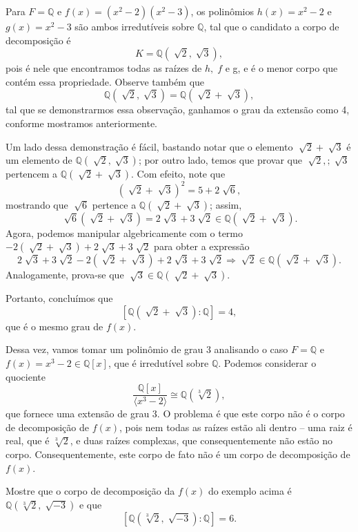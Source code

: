 \documentclass[../algebraIII_notes.tex]{subfiles}
\begin{document}
\begin{example}
	Para \(F=\mathbb{Q}\) e \(f(x)=(x^{2}-2)(x^{2}-3)\), os polinômios \(h(x)=x^{2}-2\) e \(g(x)=x^{2}-3\) são ambos irredutíveis sobre \(\mathbb{Q}\), tal que o candidato a corpo de decomposição é
	\[
		K=\mathbb{Q}(\sqrt[]{2}, \sqrt[]{3}),
	\]
	pois é nele que encontramos todas as raízes de \(h, \; f\) e g, e é o menor corpo que contém essa propriedade. Observe também que
	\[
		\mathbb{Q}(\sqrt[]{2}, \sqrt[]{3})=\mathbb{Q}(\sqrt[]{2}+\sqrt[]{3}),
	\]
	tal que se demonstrarmos essa observação, ganhamos o grau da extensão como 4, conforme mostramos anteriormente.

	Um lado dessa demonstração é fácil, bastando notar que o elemento \(\sqrt[]{2}+\sqrt[]{3}\) é um elemento de \(\mathbb{Q}(\sqrt[]{2}, \sqrt[]{3})\); por outro lado, temos que provar que \(\sqrt[]{2},; \sqrt[]{3}\) pertencem a \(\mathbb{Q}(\sqrt[]{2}+\sqrt[]{3})\). Com efeito, note que
	\[
		(\sqrt[]{2}+\sqrt[]{3})^{2}=5+2\sqrt[]{6},
	\]
	mostrando que \(\sqrt[]{6}\) pertence a \(\mathbb{Q}(\sqrt[]{2}+\sqrt[]{3})\); assim,
	\[
		\sqrt[]{6}(\sqrt[]{2}+\sqrt[]{3}) = 2\sqrt[]{3}+3\sqrt[]{2}\in \mathbb{Q}(\sqrt[]{2}+\sqrt[]{3}).
	\]
	Agora, podemos manipular algebricamente com o termo \(-2(\sqrt[]{2}+\sqrt[]{3})+2\sqrt[]{3}+3\sqrt[]{2}\) para obter a expressão
	\[
		2\sqrt[]{3}+3\sqrt[]{2}-2(\sqrt[]{2}+\sqrt[]{3})+2\sqrt[]{3}+3\sqrt[]{2} \Rightarrow \sqrt[]{2}\in \mathbb{Q}(\sqrt[]{2}+\sqrt[]{3}).
	\]
	Analogamente, prova-se que \(\sqrt[]{3}\in \mathbb{Q}(\sqrt[]{2}+\sqrt[]{3})\).

	Portanto, concluímos que
	\[
		[\mathbb{Q}(\sqrt[]{2}+\sqrt[]{3}):\mathbb{Q}]=4,
	\]
	que é o mesmo grau de \(f(x)\).
\end{example}
\begin{example}
	Dessa vez, vamos tomar um polinômio de grau 3 analisando o caso \(F=\mathbb{Q}\) e \(f(x)=x^{3}-2\in \mathbb{Q}[x]\), que é irredutível sobre \(\mathbb{Q}\).
	Podemos considerar o quociente
	\[
		\frac{\mathbb{Q}[x]}{\langle x^{3}-2 \rangle}\cong \mathbb{Q}(\sqrt[3]{2}),
	\]
	que fornece uma extensão de grau 3. O problema é que este corpo não é o corpo de decomposição de \(f(x)\), pois nem todas as raízes estão ali dentro -- uma raiz é real, que é \(\sqrt[3]{2}\), e duas raízes complexas, que consequentemente não estão no corpo.
	Consequentemente, este corpo de fato não é um corpo de decomposição de \(f(x)\).
\end{example}
\begin{exr}
	Mostre que o corpo de decomposição da \(f(x)\) do exemplo acima é \(\mathbb{Q}(\sqrt[3]{2}, \sqrt[]{-3})\) e que
	\[
		[\mathbb{Q}(\sqrt[3]{2}, \sqrt[]{-3}): \mathbb{Q}]=6.
	\]
\end{exr}
\end{document}
